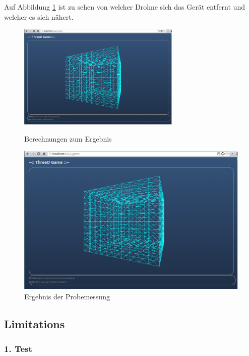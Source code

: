 \documentclass[a4paper]{spie}  %
\begin{document}
Auf Abbildung \ref{fig:test1} ist zu sehen von welcher Drohne sich das Gerät entfernt und welcher es sich nähert.\\

\begin{figure}[H]
\begin{minipage}[t]{0.4\textwidth}
\vspace{0pt}
\includegraphics[height=5cm]{./images/FrontendInit.png}
\caption{Berechnungen zum Ergebnis}
\label{fig:tablleMessung}
\end{minipage}
\hfill
\begin{minipage}[t]{0.5\textwidth}
\vspace{0pt}
		\includegraphics[width=\textwidth]{./images/FrontendInit.png}
		\caption{Ergebnis der Probemessung}
		\label{fig:test1}
\end{minipage}
\end{figure}

\subsection{Limitations}
\subsubsection{1. Test}
\end{document}
